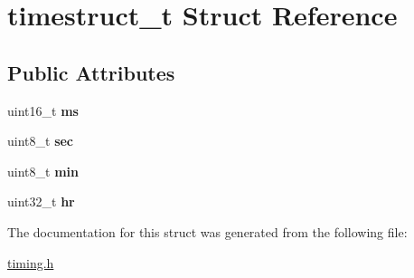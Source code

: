 \hypertarget{structtimestruct__t}{\section{timestruct\+\_\+t Struct Reference}
\label{structtimestruct__t}
}
\subsection*{Public Attributes}
\begin{DoxyCompactItemize}
\item 
\hypertarget{structtimestruct__t_ae78f0e897c2ce69751a8358dd2d75496}{uint16\+\_\+t {\bfseries ms}}\label{structtimestruct__t_ae78f0e897c2ce69751a8358dd2d75496}

\item 
\hypertarget{structtimestruct__t_a9be6624b82be6f3dd6b06b883db82973}{uint8\+\_\+t {\bfseries sec}}\label{structtimestruct__t_a9be6624b82be6f3dd6b06b883db82973}

\item 
\hypertarget{structtimestruct__t_a4f983bb453ed69f14fa5208643ce89e2}{uint8\+\_\+t {\bfseries min}}\label{structtimestruct__t_a4f983bb453ed69f14fa5208643ce89e2}

\item 
\hypertarget{structtimestruct__t_a9434e5422775d1dc1e8939002a425a1e}{uint32\+\_\+t {\bfseries hr}}\label{structtimestruct__t_a9434e5422775d1dc1e8939002a425a1e}

\end{DoxyCompactItemize}


The documentation for this struct was generated from the following file\+:\begin{DoxyCompactItemize}
\item 
\hyperlink{timing_8h}{timing.\+h}\end{DoxyCompactItemize}
